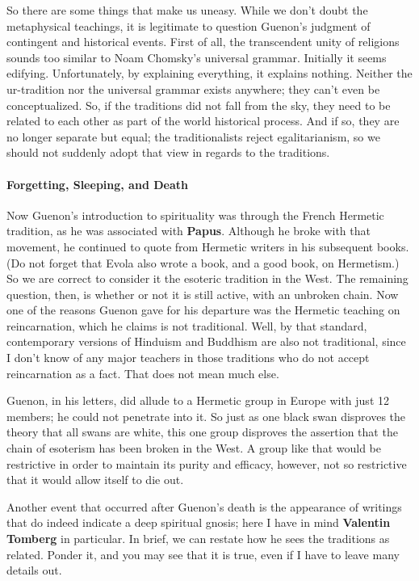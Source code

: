 So there are some things that make us uneasy. While we don't doubt the metaphysical teachings, it is legitimate to question Guenon's judgment of contingent and historical events. First of all, the transcendent unity of religions sounds too similar to Noam Chomsky's universal grammar. Initially it seems edifying. Unfortunately, by explaining everything, it explains nothing. Neither the ur-tradition nor the universal grammar exists anywhere; they can't even be conceptualized. So, if the traditions did not fall from the sky, they need to be related to each other as part of the world historical process. And if so, they are no longer separate but equal; the traditionalists reject egalitarianism, so we should not suddenly adopt that view in regards to the traditions.

\paragraph{Forgetting, Sleeping, and Death}
Now Guenon's introduction to spirituality was through the French Hermetic tradition, as he was associated with \textbf{Papus}. Although he broke with that movement, he continued to quote from Hermetic writers in his subsequent books. (Do not forget that Evola also wrote a book, and a good book, on Hermetism.) So we are correct to consider it the esoteric tradition in the West. The remaining question, then, is whether or not it is still active, with an unbroken chain. Now one of the reasons Guenon gave for his departure was the Hermetic teaching on reincarnation, which he claims is not traditional. Well, by that standard, contemporary versions of Hinduism and Buddhism are also not traditional, since I don't know of any major teachers in those traditions who do not accept reincarnation as a fact. That does not mean much else.

Guenon, in his letters, did allude to a Hermetic group in Europe with just 12 members; he could not penetrate into it. So just as one black swan disproves the theory that all swans are white, this one group disproves the assertion that the chain of esoterism has been broken in the West. A group like that would be restrictive in order to maintain its purity and efficacy, however, not so restrictive that it would allow itself to die out.

Another event that occurred after Guenon's death is the appearance of writings that do indeed indicate a deep spiritual gnosis; here I have in mind \textbf{Valentin Tomberg} in particular. In brief, we can restate how he sees the traditions as related. Ponder it, and you may see that it is true, even if I have to leave many details out.

